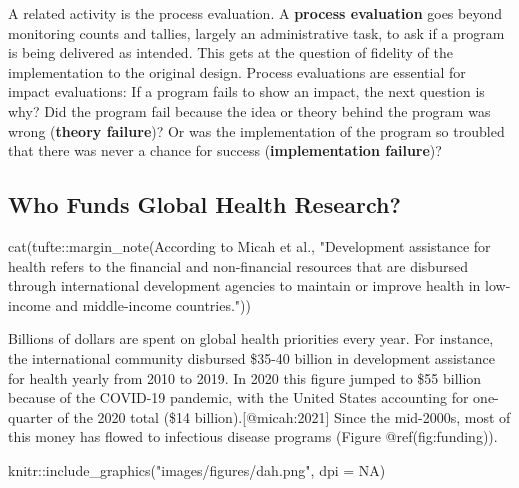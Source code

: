 \documentclass[
  letterpaper,
  DIV=11,
  numbers=noendperiod,
  oneside]{scrartcl}
\newenvironment{Shaded}{\begin{snugshade}}{\end{snugshade}}
\newcommand{\AttributeTok}[1]{\textcolor[rgb]{0.40,0.45,0.13}{#1}}
\newcommand{\ConstantTok}[1]{\textcolor[rgb]{0.56,0.35,0.01}{#1}}
\newcommand{\FunctionTok}[1]{\textcolor[rgb]{0.28,0.35,0.67}{#1}}
\newcommand{\NormalTok}[1]{\textcolor[rgb]{0.00,0.23,0.31}{#1}}
\newcommand{\SpecialCharTok}[1]{\textcolor[rgb]{0.37,0.37,0.37}{#1}}
\newcommand{\StringTok}[1]{\textcolor[rgb]{0.13,0.47,0.30}{#1}}
\begin{document}
A related activity is the process evaluation. A \textbf{process
evaluation} goes beyond monitoring counts and tallies, largely an
administrative task, to ask if a program is being delivered as intended.
This gets at the question of fidelity of the implementation to the
original design. Process evaluations are essential for impact
evaluations: If a program fails to show an impact, the next question is
why? Did the program fail because the idea or theory behind the program
was wrong (\textbf{theory failure})? Or was the implementation of the
program so troubled that there was never a chance for success
(\textbf{implementation failure})?

\hypertarget{who-funds-global-health-research}{%
\subsection{Who Funds Global Health
Research?}\label{who-funds-global-health-research}}

\begin{Shaded}
\begin{Highlighting}[]
\FunctionTok{cat}\NormalTok{(tufte}\SpecialCharTok{::}\FunctionTok{margin\_note}\NormalTok{(}\StringTok{\textquotesingle{}According to Micah et al., "Development assistance for health refers to the financial and non{-}financial resources that are disbursed through international development agencies to maintain or improve health in low{-}income and middle{-}income countries."\textquotesingle{}}\NormalTok{))}
\end{Highlighting}
\end{Shaded}


Billions of dollars are spent on global health priorities every year.
For instance, the international community disbursed \$35-40 billion in
development assistance for health yearly from 2010 to 2019. In 2020 this
figure jumped to \$55 billion because of the COVID-19 pandemic, with the
United States accounting for one-quarter of the 2020 total (\$14
billion).{[}@micah:2021{]} Since the mid-2000s, most of this money has
flowed to infectious disease programs (Figure @ref(fig:funding)).

\begin{Shaded}
\begin{Highlighting}[]
\NormalTok{knitr}\SpecialCharTok{::}\FunctionTok{include\_graphics}\NormalTok{(}\StringTok{"images/figures/dah.png"}\NormalTok{, }\AttributeTok{dpi =} \ConstantTok{NA}\NormalTok{)}
\end{Highlighting}
\end{Shaded}
\end{document}
